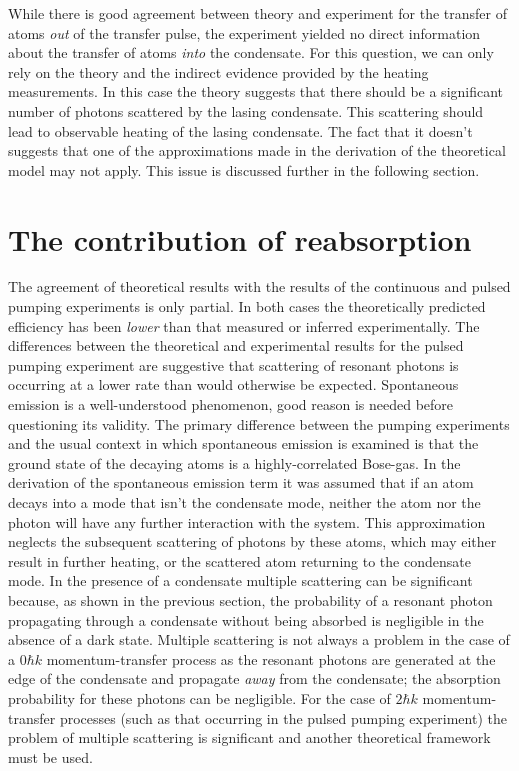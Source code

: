 \parasep

While there is good agreement between theory and experiment for the transfer of atoms \emph{out} of the transfer pulse, the experiment yielded no direct information about the transfer of atoms \emph{into} the condensate.  For this question, we can only rely on the theory and the indirect evidence provided by the heating measurements.  In this case the theory suggests that there should be a significant number of photons scattered by the lasing condensate.  This scattering should lead to observable heating of the lasing condensate.  The fact that it doesn't suggests that one of the approximations made in the derivation of the theoretical model may not apply.  This issue is discussed further in the following section.

\section{The contribution of reabsorption}
\label{OpticalPumping:Discussion}

The agreement of theoretical results with the results of the continuous and pulsed pumping experiments is only partial.  In both cases the theoretically predicted efficiency has been \emph{lower} than that measured or inferred experimentally.  The differences between the theoretical and experimental results for the pulsed pumping experiment are suggestive that scattering of resonant photons is occurring at a lower rate than would otherwise be expected.  Spontaneous emission is a well-understood phenomenon, good reason is needed before questioning its validity.  The primary difference between the pumping experiments and the usual context in which spontaneous emission is examined is that the ground state of the decaying atoms is a highly-correlated Bose-gas.  In the derivation of the spontaneous emission term it was assumed that if an atom decays into a mode that isn't the condensate mode, neither the atom nor the photon will have any further interaction with the system.  This approximation neglects the subsequent scattering of photons by these atoms, which may either result in further heating, or the scattered atom returning to the condensate mode.  In the presence of a condensate multiple scattering can be significant because, as shown in the previous section, the probability of a resonant photon propagating through a condensate without being absorbed is negligible in the absence of a dark state.  Multiple scattering is not always a problem in the case of a $0 \hbar k$ momentum-transfer process as the resonant photons are generated at the edge of the condensate and propagate \emph{away} from the condensate; the absorption probability for these photons can be negligible.  For the case of $2 \hbar k$ momentum-transfer processes (such as that occurring in the pulsed pumping experiment) the problem of multiple scattering is significant and another theoretical framework must be used.

